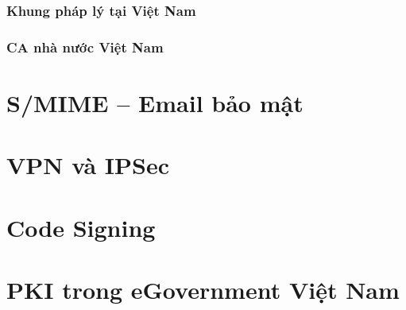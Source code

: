 \subsubsection*{Khung pháp lý tại Việt Nam}

\subsubsection*{CA nhà nước Việt Nam}

\section{S/MIME -- Email bảo mật}
\label{sec:5.3}

\section{VPN và IPSec}
\label{sec:5.4}

\section{Code Signing}
\label{sec:5.5}

\section{PKI trong eGovernment Việt Nam}
\label{sec:5.6}
